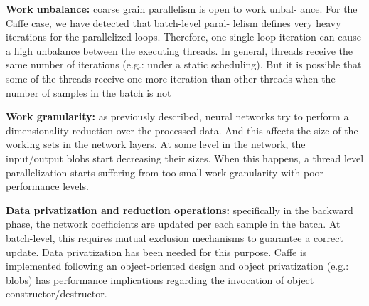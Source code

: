 \textbf{Work unbalance:} coarse grain parallelism is open to work unbal-
ance. For the Caffe case, we have detected that batch-level paral-
lelism defines very heavy iterations for the parallelized loops.
Therefore, one single loop iteration can cause a high unbalance
between the executing threads. In general, threads receive the
same number of iterations (e.g.: under a static scheduling). But it
is possible that some of the threads receive one more iteration
than other threads when the number of samples in the batch is not

\textbf{Work granularity:} as previously described, neural networks try
to perform a dimensionality reduction over the processed data.
And this affects the size of the working sets in the network layers.
At some level in the network, the input/output blobs start decreasing their sizes. When this happens, a thread level parallelization
starts suffering from too small work granularity with poor performance levels.

\textbf{Data privatization and reduction operations:} specifically in the
backward phase, the network coefficients are updated per each
sample in the batch. At batch-level, this requires mutual exclusion
mechanisms to guarantee a correct update. Data privatization has
been needed for this purpose. Caffe is implemented following an
object-oriented design and object privatization (e.g.: blobs) has
performance implications regarding the invocation of object constructor/destructor.


